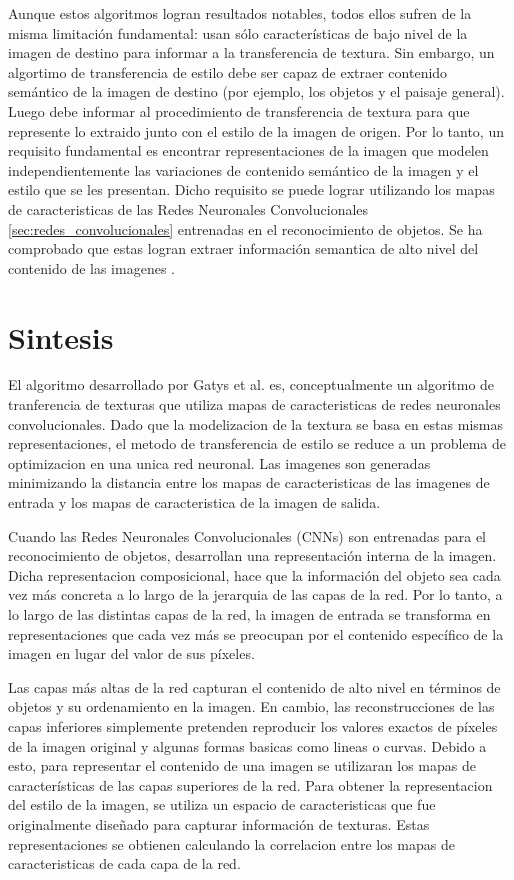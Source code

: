 \documentclass[a4paper,11pt,spanish]{book}
\begin{document}
      Aunque estos algoritmos logran resultados notables, todos ellos sufren de la misma limitación fundamental: usan sólo características de bajo nivel de la imagen de destino para
      informar a la transferencia de textura. Sin embargo, un algortimo de transferencia de estilo debe ser capaz de extraer contenido semántico de la imagen de
      destino (por ejemplo, los objetos y el paisaje general). Luego debe informar al procedimiento de transferencia de textura para que represente lo extraido
      junto con el estilo de la imagen de origen. Por lo tanto, un requisito fundamental es encontrar representaciones de la imagen que modelen independientemente las variaciones
      de contenido semántico de la imagen y el estilo que se les presentan. Dicho requisito se puede lograr utilizando los mapas de caracteristicas de las Redes Neuronales Convolucionales \ref{sec:redes_convolucionales}
      entrenadas en el reconocimiento de objetos. Se ha comprobado que estas logran extraer información semantica de alto nivel del contenido de las imagenes \cite{AlexNet}.


    \section{Sintesis} \label{sec:sintesis}
      El algoritmo desarrollado por Gatys et al. es, conceptualmente un algoritmo de tranferencia de texturas que utiliza mapas de caracteristicas de redes neuronales convolucionales. 
      Dado que la modelizacion de la textura se basa en estas mismas representaciones, el metodo de transferencia de estilo se reduce a un problema
      de optimizacion en una unica red neuronal. Las imagenes son generadas minimizando la distancia entre los mapas de caracteristicas de las imagenes de entrada y los mapas de
      caracteristica de la imagen de salida.
      
      Cuando las Redes Neuronales Convolucionales (CNNs) son entrenadas para el reconocimiento de objetos, desarrollan una representación interna de la imagen.
      Dicha representacion composicional, hace que la información del objeto sea cada vez más concreta a lo largo de la jerarquia de las capas de la red. 
      Por lo tanto, a lo largo de las distintas capas de la red, la imagen de entrada se transforma en representaciones que cada vez más se preocupan 
      por el contenido específico de la imagen en lugar del valor de sus píxeles.
      
      Las capas más altas de la red capturan el contenido de alto nivel en términos de objetos y su ordenamiento en la imagen. 
      En cambio, las reconstrucciones de las capas inferiores simplemente pretenden reproducir los valores exactos de píxeles de la imagen original y algunas formas
      basicas como lineas o curvas. 
      Debido a esto, para representar el contenido de una imagen se utilizaran los mapas de características de las capas superiores de la red.
      Para obtener la representacion del estilo de la imagen, se utiliza un espacio de caracteristicas que fue originalmente diseñado para capturar información de texturas.
      Estas representaciones se obtienen calculando la correlacion entre los mapas de caracteristicas de cada capa de la red. 
      
\end{document}
